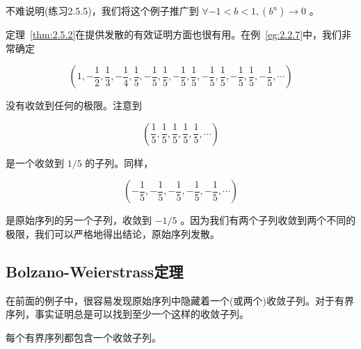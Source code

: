 不难说明(练习2.5.5)，我们将这个例子推广到 \(\forall -1<b<1, \left( {b}^{n}\right)  \rightarrow  0\) 。


\begin{Eg}[发散准则]
  \label{eg:2.5.4}
定理~\ref{thm:2.5.2}在提供发散的有效证明方面也很有用。在例~\ref{eg:2.2.7}中，我们非常确定

\[
\left( {1, - \frac{1}{2},\frac{1}{3}, - \frac{1}{4},\frac{1}{5}, - \frac{1}{5},\frac{1}{5}, - \frac{1}{5},\frac{1}{5}, - \frac{1}{5},\frac{1}{5}, - \frac{1}{5},\frac{1}{5}, - \frac{1}{5},\cdots }\right)
\]

没有收敛到任何的极限。注意到

\[
\left( {\frac{1}{5},\frac{1}{5},\frac{1}{5},\frac{1}{5},\frac{1}{5},\cdots }\right)
\]

是一个收敛到 \(1/5\) 的子列。同样，

\[
\left( {-\frac{1}{5}, - \frac{1}{5}, - \frac{1}{5}, - \frac{1}{5}, - \frac{1}{5},\cdots }\right)
\]

是原始序列的另一个子列，收敛到 \(- 1/5\) 。因为我们有两个子列收敛到两个不同的极限，我们可以严格地得出结论，原始序列发散。
\end{Eg}

\subsection{Bolzano-Weierstrass定理}
在前面的例子中，很容易发现原始序列中隐藏着一个(或两个)收敛子列。对于有界序列，事实证明总是可以找到至少一个这样的收敛子列。

\begin{Thm}
每个有界序列都包含一个收敛子列。  
\end{Thm}

